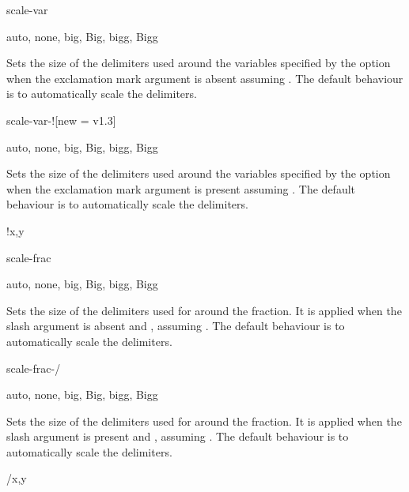 \begin{option}{scale-var}
	\begin{values}[default = auto]
		auto, none, big, Big, bigg, Bigg
	\end{values}
	Sets the size of the delimiters used around the variables specified by the  option when the exclamation mark argument is absent assuming . The default behaviour is to automatically scale the delimiters.
	\begin{example}
	\end{example}
\end{option}

\begin{option}{scale-var-!}[new = v1.3]
	\begin{values}[default = auto]
		auto, none, big, Big, bigg, Bigg
	\end{values}
	Sets the size of the delimiters used around the variables specified by the  option when the exclamation mark argument is present assuming . The default behaviour is to automatically scale the delimiters.
	\begin{example}
		!{x,y}
	\end{example}
\end{option}

\begin{option}{scale-frac}
	\begin{values}[default = auto]
		auto, none, big, Big, bigg, Bigg
	\end{values}
	Sets the size of the delimiters used for around the fraction. It is applied when the slash argument is absent and , assuming . The default behaviour is to automatically scale the delimiters.
	\begin{example}
		\pdv[scale-frac=bigg, frac]{f}{x,y}
	\end{example}
\end{option}

\begin{option}{scale-frac-/}
	\begin{values}[default = auto]
		auto, none, big, Big, bigg, Bigg
	\end{values}
	Sets the size of the delimiters used for around the fraction. It is applied when the slash argument is present and , assuming . The default behaviour is to automatically scale the delimiters.
	\begin{example}
		/{x,y}
	\end{example}
\end{option}

